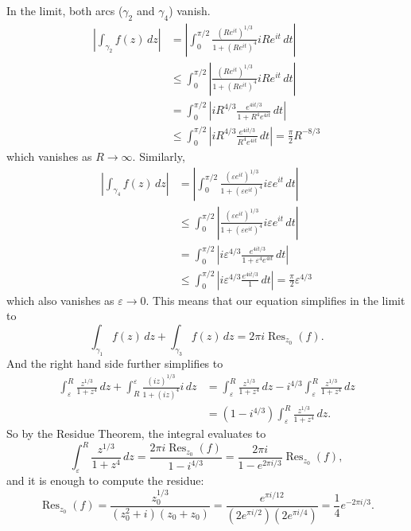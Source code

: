 \documentclass{article}
\begin{document}
In the limit, both arcs ($\gamma_2$ and $\gamma_4$) vanish.
\begin{align*}
  \left|\int_{\gamma_2}f(z)\,dz\right|
  &= \left|
    \int_0^{\pi/2}\frac{(Re^{it})^{1/3}}{1 + {(Re^{it})^4}}iRe^{it}\,dt
  \right|\\
  &\leq \int_0^{\pi/2}\left|
    \frac{(Re^{it})^{1/3}}{1 + {(Re^{it})^4}}iRe^{it}\,dt
  \right| \\
  &= \int_0^{\pi/2}\left|
    iR^{4/3}\frac{e^{4it/3}}{1 + {R^4e^{4it}}}\,dt
  \right| \\
  &\leq \int_0^{\pi/2}\left|
    iR^{4/3}\frac{e^{4it/3}}{{R^4e^{4it}}}\,dt
  \right| = \frac{\pi}{2}R^{-8/3}
\end{align*} which vanishes as $R \rightarrow \infty$.
Similarly, \begin{align*}
  \left|\int_{\gamma_4}f(z)\,dz\right|
  &= \left|
    \int_0^{\pi/2}\frac{(\varepsilon e^{it})^{1/3}}{1 + {(\varepsilon e^{it})^4}}i\varepsilon e^{it}\,dt
  \right|\\
  &\leq \int_0^{\pi/2}\left|
    \frac{(\varepsilon e^{it})^{1/3}}{1 + {(\varepsilon e^{it})^4}}i\varepsilon e^{it}\,dt
  \right| \\
  &= \int_0^{\pi/2}\left|
    i\varepsilon ^{4/3}\frac{e^{4it/3}}{1 + {\varepsilon ^4e^{4it}}}\,dt
  \right| \\
  &\leq \int_0^{\pi/2}\left|
    i\varepsilon ^{4/3}\frac{e^{4it/3}}{1}\,dt
  \right| = \frac{\pi}{2}\varepsilon ^{4/3}
\end{align*} which also vanishes as $\varepsilon \rightarrow 0$.
This means that our equation simplifies in the limit to \[
  \int_{\gamma_1} f(z)\,dz +
  \int_{\gamma_3} f(z)\,dz =
  2\pi i \operatorname{Res}_{z_0}(f).
\] And the right hand side further simplifies to \begin{align*}
  \int_\varepsilon^R\frac{z^{1/3}}{1 + {z^4}}\,dz +
  \int_R^\varepsilon\frac{(iz)^{1/3}}{1 + {(iz)^4}}i\,dz &=
  \int_\varepsilon^R\frac{z^{1/3}}{1 + {z^4}}\,dz -
  i^{4/3}\int_\varepsilon^R\frac{z^{1/3}}{1 + {z^4}}\,dz\\
  &= (1 - i^{4/3}) \int_\varepsilon^R\frac{z^{1/3}}{1 + {z^4}}\,dz.
\end{align*}
So by the Residue Theorem, the integral evaluates to \[
  \int_\varepsilon^R\frac{z^{1/3}}{1 + {z^4}}\,dz
  = \frac{2\pi i\operatorname{Res}_{z_0}(f)}{1 - i^{4/3}}
  = \frac{2\pi i}{1 - e^{2\pi i/3}}\operatorname{Res}_{z_0}(f),
\] and it is enough to compute the residue: \[
  \operatorname{Res}_{z_0}(f)
  = \frac{z_0^{1/3}}{(z_0^2 + i)(z_0 + z_0)}
  = \frac{e^{\pi i/12}}{(2e^{\pi i/2})(2e^{\pi i/4})}
  = \frac{1}{4} e^{-2\pi i/3}.
\]
\end{document}
